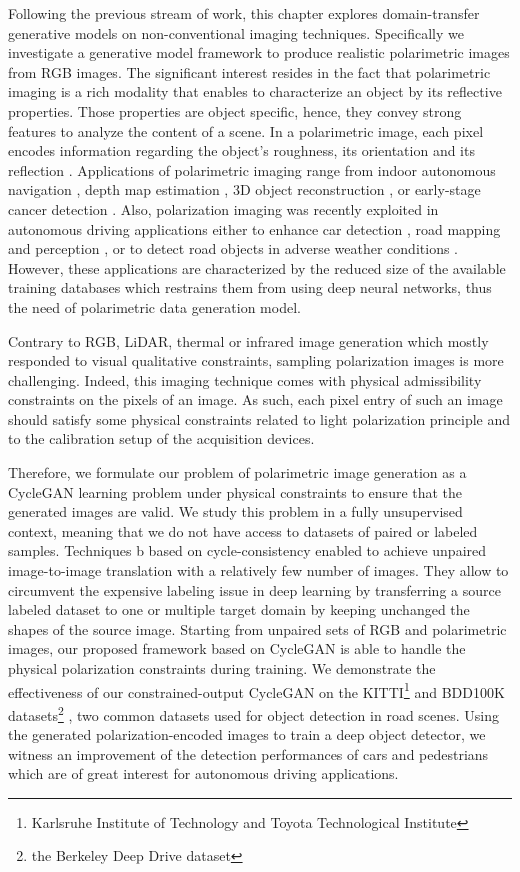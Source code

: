 Following the previous stream of work, this chapter explores domain-transfer generative models on non-conventional imaging techniques. Specifically we investigate a  generative model framework to produce realistic polarimetric images from \ac{RGB} images.  The significant interest resides in the fact that polarimetric imaging is a rich modality that enables to characterize an object by its reflective properties. Those properties are object specific, hence, they convey strong features to analyze the content of a scene. In a polarimetric image, each pixel encodes information regarding the object's roughness, its orientation and its reflection \citep{Wolff1995}. Applications of polarimetric imaging range from indoor autonomous navigation \citep{Berger2017}, depth map estimation \citep{Zhu2019}, 3D object reconstruction \citep{Morel2006},  or early-stage cancer detection \citep{Rehbinder2016}. Also, polarization imaging was recently exploited in autonomous driving applications either to enhance car detection \citep{Fan2018}, road mapping and perception \citep{Aycock2017}, or to detect road objects in adverse weather conditions \citep{Blin2019}.  However, these  applications are characterized by the reduced size of the available training databases which restrains them from using deep neural networks, thus the need of polarimetric data generation model. 

Contrary to \ac{RGB}, \ac{LiDAR}, thermal or infrared image generation which mostly responded to visual qualitative  constraints, sampling polarization images is more challenging. Indeed, this imaging technique comes with physical admissibility constraints on the pixels of an image. As such, each pixel entry of such an image should satisfy some physical constraints related to light polarization principle and to the calibration setup of the acquisition devices.

Therefore, we formulate our problem of polarimetric image generation as a CycleGAN learning problem under physical constraints to ensure that the generated images are valid.  We study this problem in a fully unsupervised context, meaning that we do not have access to datasets of paired or labeled samples.  Techniques b based on cycle-consistency \citep{Zhu2017a} enabled to achieve unpaired image-to-image translation with a relatively few number of images. They allow to circumvent the expensive labeling issue in deep learning by transferring a source labeled dataset to one or multiple target domain \citep{Almahairi2018} by keeping unchanged the shapes of the source image. Starting from unpaired sets of RGB and polarimetric images, our proposed framework based on \ac{CycleGAN} \citep{Zhu2017a} is able to handle the physical polarization constraints during training. We demonstrate the effectiveness of our constrained-output CycleGAN on the KITTI\footnote{Karlsruhe Institute of Technology and Toyota Technological Institute}\citep{Geiger2012} and BDD100K datasets\footnote{the Berkeley Deep Drive dataset} \citep{Yu2020}, two common datasets used for object detection in road scenes. Using the generated polarization-encoded images to train a deep object detector, we witness an improvement of the detection performances of cars and pedestrians which are of great interest for autonomous driving applications. 

